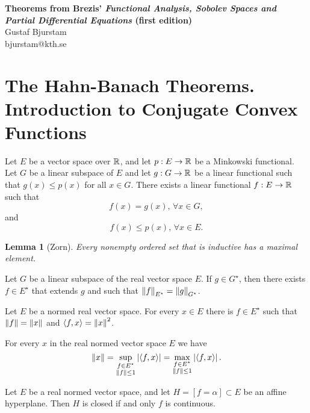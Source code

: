 \documentclass[11pt]{article}
\theoremstyle{plain}
\newtheorem{lemma}{Lemma}[section]
\begin{document}
\begin{center}
\textbf{\large Theorems from Brezis' \textit{Functional Analysis, Sobolev Spaces and Partial Differential Equations} (first edition)} \\
Gustaf Bjurstam\\
bjurstam@kth.se\\
\end{center}

\section{The Hahn-Banach Theorems. Introduction to Conjugate Convex Functions}
\begin{theorem}
    Let $E$ be a vector space over $\mathbb{R}$, and let $p:E\to\mathbb{R}$ be a Minkowski functional. Let $G$ be a linear subspace of $E$ and let $g:G\to \mathbb{R}$ be a linear functional such that $g(x)\leq p(x)$ for all $x\in G$. There exists a linear functional $f:E\to \mathbb{R}$ such that
    \begin{equation*}
        f(x)=g(x),\, \forall x\in G,
    \end{equation*}
    and 
    \begin{equation*}
        f(x)\leq p(x),\, \forall x\in E.
    \end{equation*}
\end{theorem}

\begin{lemma}[Zorn]
    Every nonempty ordered set that is inductive has a maximal element.
\end{lemma}

\begin{corollary}
    Let $G$ be a linear subspace of the real vector space $E$. If $g\in G^\star$, then there exists $f\in E^\star$ that extends $g$ and such that $\left\lVert f\right\rVert_{E^\star} = \left\lVert g\right\rVert_{G^\star}$.
\end{corollary}

\begin{corollary}
    Let $E$ be a normed real vector space. For every $x\in E$ there is $f\in E^\star$ such that $\left\lVert f\right\rVert = \left\lVert x\right\rVert$ and $\left\langle f, x\right\rangle = \left\lVert x\right\rVert^2$.
\end{corollary}

\begin{corollary}
    For every $x$ in the real normed vector space $E$ we have
    \begin{equation*}
        \left\lVert x\right\rVert = \sup_{\substack{f\in E^\star \\ \left\lVert f\right\rVert\leq 1}} \left|\left\langle f, x\right\rangle\right| = \max_{\substack{f\in E^\star \\ \left\lVert f\right\rVert\leq 1}} \left|\left\langle f, x\right\rangle\right|.
    \end{equation*}
\end{corollary}

\begin{proposition}
    Let $E$ be a real normed vector space, and let $H=[f=\alpha]\subset E$ be an affine hyperplane. Then $H$ is closed if and only $f$ is continuous.
\end{proposition}
\end{document}
